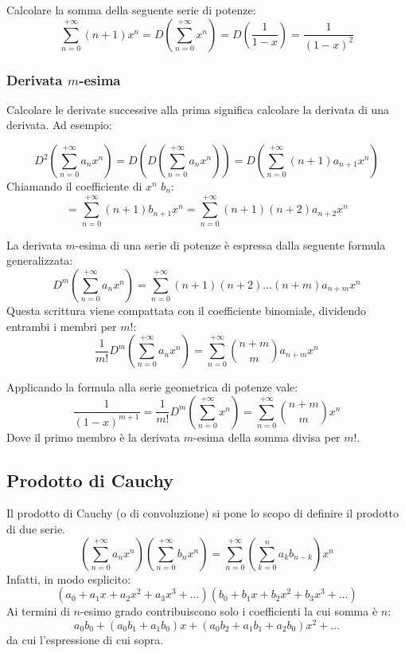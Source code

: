 \begin{examp}
	\label{ex:dergeom}
	Calcolare la somma della seguente serie di potenze:
	\[
		\sum_{n=0}^{+\infty}(n+1)x^n=D\left(\sum_{n=0}^{+\infty}x^n\right)=D\left(\frac{1}{1-x}\right)=\frac{1}{(1-x)^2}
	\]
\end{examp}

\subsubsection{Derivata $m$-esima}
Calcolare le derivate successive alla prima significa calcolare la derivata di una derivata. Ad esempio:
\begin{examp}
	\[
		D^2\left(\sum_{n=0}^{+\infty}a_nx^n\right)=D\left(D\left(\sum_{n=0}^{+\infty}a_nx^n\right)\right)=D\left(\sum_{n=0}^{+\infty}(n+1)a_{n+1}x^n\right)
	\]
	Chiamando il coefficiente di $x^n$ $b_n$:
	\[
		=\sum_{n=0}^{+\infty}(n+1)b_{n+1}x^n=\sum_{n=0}^{+\infty}(n+1)(n+2)a_{n+2}x^n
	\]
\end{examp}

La derivata $m$-esima di una serie di potenze è espressa dalla seguente formula generalizzata:
\begin{equation}
	D^m\left(\sum_{n=0}^{+\infty}a_nx^n\right)=\sum_{n=0}^{+\infty}(n+1)(n+2)\dots(n+m)a_{n+m}x^n
\end{equation}
Questa scrittura viene compattata con il coefficiente binomiale, dividendo entrambi i membri per $m!$:
\[
	\frac{1}{m!}D^m\left(\sum_{n=0}^{+\infty}a_nx^n\right)=\sum_{n=0}^{+\infty}\binom{n+m}{m}a_{n+m}x^n
\]

Applicando la formula alla serie geometrica di potenze vale:
\[
	\frac{1}{(1-x)^{m+1}}=\frac{1}{m!}D^m\left(\sum_{n=0}^{+\infty}x^n\right)=\sum_{n=0}^{+\infty}\binom{n+m}{m}x^n
\]
Dove il primo membro è la derivata $m$-esima della somma divisa per $m!$.


\subsection{Prodotto di Cauchy}
Il prodotto di Cauchy (o di convoluzione) si pone lo scopo di definire il prodotto di due serie.
\[
	\left(\sum_{n=0}^{+\infty} a_nx^n\right)\left(\sum_{n=0}^{+\infty}b_nx^n\right)=\sum_{n=0}^{+\infty}\left(\sum_{k=0}^na_kb_{n-k}\right)x^n
\]
Infatti, in modo esplicito:
\[
	(a_0+a_1x+a_2x^2+a_3x^3+\dots)(b_0+b_1x+b_2x^2+b_3x^3+\dots)
\]
Ai termini di $n$-esimo grado contribuiscono solo i coefficienti la cui somma è $n$:
\[
	a_0b_0+(a_0b_1+a_1b_0)x+(a_0b_2+a_1b_1+a_2b_0)x^2+\dots
\]
da cui l'espressione di cui sopra.


